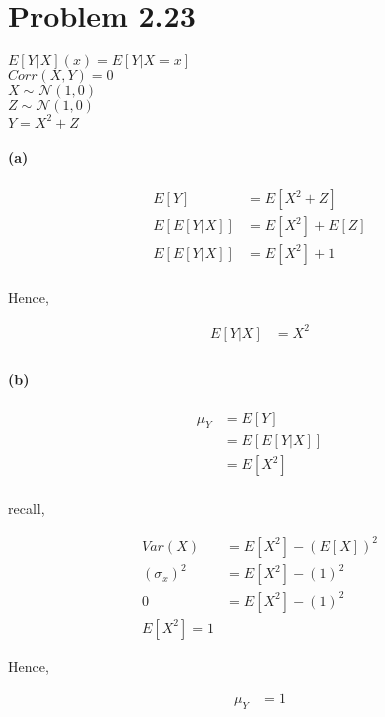 \documentclass[10pt,letter]{article}
\begin{document}
\section*{Problem 2.23}
$E[Y|X](x) = E[Y|X=x]$\\
$Corr(X,Y) = 0$\\
$X\sim \mathcal{N}(1,0)$\\
$Z\sim \mathcal{N}(1,0)$\\
$Y = X^2 + Z$\\
\paragraph{(a)}
\begin{align*}
E[Y]&= E[X^2 + Z]\\
E\left[E[Y|X]\right] &= E[X^2] + E[Z]\\
E\left[E[Y|X]\right] &= E[X^2] + 1\\
\end{align*}
\begin{center}
	Hence,
\end{center}

\begin{align*}
E[Y|X] &= X^2\\
\end{align*}

\paragraph{(b)}
\begin{align*}
\mu_{Y} &= E[Y]\\
& = E\left[E[Y|X]\right]\\
& = E[X^2]\\
\end{align*}
\begin{center}
recall,
\end{center}
\begin{align*}
Var(X) &= E[X^2] - \left(E[X]\right)^2\\
(\sigma_x)^2 &= E[X^2] - \left(1\right)^2\\
0 & = E[X^2] - \left(1\right)^2\\
E[X^2] = 1
\end{align*}
\begin{center}
Hence,
\end{center}
\begin{align*}
\mu_{Y} &= 1
\end{align*}
\end{document}
